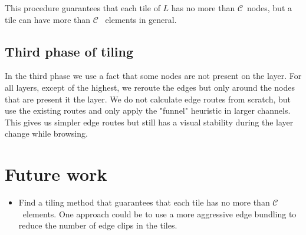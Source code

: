 \documentclass{gd-llncs}
\newcommand{\capac}{$\mathcal{C}$}
\begin{document}
This procedure guarantees that each tile of $L$ has no more than \capac~nodes, but a tile can have more than \capac~ elements in general.
\subsection*{Third phase of tiling}
In the third phase we use a fact that some nodes are not present on the layer. For all layers, except of the highest, we reroute the edges but only around the nodes that are present it the layer. We do not calculate edge routes from scratch, but use the existing routes and only apply the "funnel" heuristic in larger channels.
This gives us simpler edge routes but still has a visual stability during the layer change while browsing.

\section{Future work}
\begin{itemize}
\item Find a tiling method that guarantees that each tile has no more than \capac~elements. One approach could be to use a more aggressive edge bundling to reduce the number of edge clips in the tiles.
\end {itemize}


\end{document}
